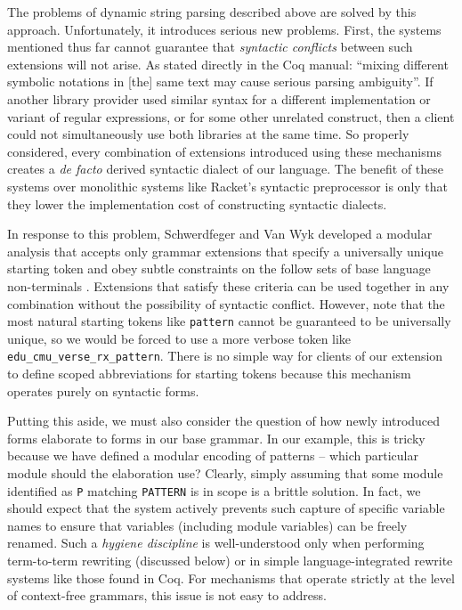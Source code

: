 The problems of dynamic string parsing described above are solved by this approach. Unfortunately, it introduces serious new problems. First, the systems mentioned thus far cannot guarantee that \emph{syntactic conflicts} between such extensions will not arise. As stated directly in the  Coq manual: ``mixing different symbolic notations in [the] same text may cause serious parsing ambiguity''. If another library provider used similar syntax for a different implementation or variant of regular expressions, or for some other unrelated construct, then a client could not simultaneously use both libraries at the same time. So properly considered, every combination of extensions introduced using these mechanisms creates a \emph{de facto} derived syntactic dialect of our language. The benefit of these systems over monolithic systems like Racket's syntactic preprocessor \cite{Flatt:2012:CLR:2063176.2063195} is only that they lower the implementation cost of constructing syntactic dialects. %

In response to this problem, Schwerdfeger and Van Wyk developed a modular analysis that accepts only grammar extensions that specify a universally unique starting token and obey subtle constraints on  the follow sets of base language non-terminals \cite{conf/pldi/SchwerdfegerW09}. Extensions that satisfy these criteria can be used together in any combination without the possibility of syntactic conflict. However, note that the most natural starting tokens like \lstinline{pattern} cannot be guaranteed to be universally unique, so we would be forced to use a more verbose token like \lstinline{edu_cmu_verse_rx_pattern}. There is no simple way for clients of our extension to define scoped abbreviations for starting tokens because this mechanism operates purely on syntactic forms.

Putting this aside, we must also consider the question of how newly introduced forms elaborate to forms in our base grammar. In our example, this is tricky because we have defined a modular encoding of patterns -- which particular module should the elaboration use? Clearly, simply assuming that some module identified as \lstinline{P} matching \lstinline{PATTERN} is in scope is a brittle solution. In fact, we should expect that the system actively prevents such capture of specific variable names to ensure that variables (including module variables) can be freely renamed. Such a \emph{hygiene discipline} is well-understood only when performing term-to-term rewriting (discussed below) or in simple language-integrated rewrite systems like those found in Coq. For mechanisms that operate strictly at the level of context-free grammars, this issue is not easy to address.

